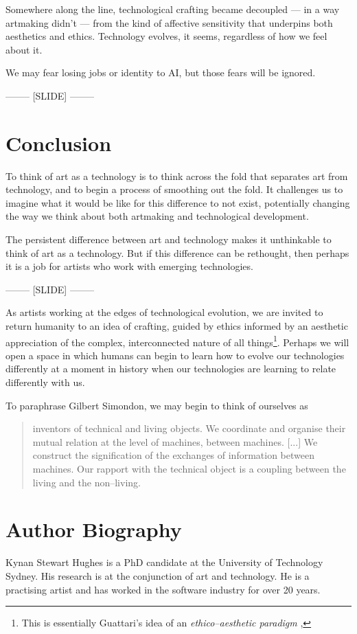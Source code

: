 \documentclass[letter:wpaper]{article}
\begin{document}
    Somewhere along the line, technological crafting became decoupled — in a way artmaking didn’t — from the kind of affective sensitivity that underpins both aesthetics and ethics. Technology evolves, it seems, regardless of how we feel about it.
    
    We may fear losing jobs or identity to AI, but those fears will be ignored.
     
-------- [SLIDE] --------

\section{Conclusion}

    To think of art as a technology is to think across the fold that separates art from technology, and to begin a process of smoothing out the fold. It challenges us to imagine what it would be like for this difference to not exist, potentially changing the way we think about both artmaking and technological development.
    
    The persistent difference between art and technology makes it unthinkable to think of art as a technology. But if this difference can be rethought, then perhaps it is a job for artists who work with emerging technologies. 
    
-------- [SLIDE] --------

    As artists working at the edges of technological evolution, we are invited to return humanity to an idea of crafting, guided by ethics informed by an aesthetic appreciation of the complex, interconnected nature of all things\footnote{
        This is essentially Guattari's idea of an \emph{ethico–aesthetic paradigm} \citep[p.131]{GuattariChsmss1995}, 
    }. Perhaps we will open a space in which humans can begin to learn how to evolve our technologies differently at a moment in history when our technologies are learning to relate differently with us.
    
    To paraphrase Gilbert Simondon, we may begin to think of ourselves as

    \begin{quote}
        inventors of technical and living objects. We coordinate and organise their mutual relation at the level of machines, between machines. [...] We construct the signification of the exchanges of information between machines. Our rapport with the technical object is a coupling between the living and the non–living. \citep[p.xvi]{SimondonOnThMdOfExstncOfTechnclObjcts1980}
    \end{quote}
    



\section{Author Biography}

Kynan Stewart Hughes is a PhD candidate at the University of Technology Sydney. His research is at the conjunction of art and technology. He is a practising artist and has worked in the software industry for over 20 years. 
\end{document}
